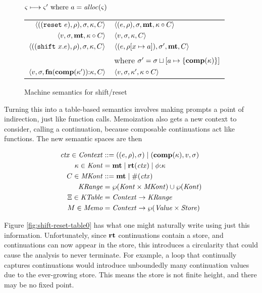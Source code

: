 \begin{figure}
  \centering
  $\varsigma \longmapsto \varsigma' \text{ where } a = \mathit{alloc}(\varsigma)$ \\
  \begin{tabular}{r|l}
    \hline
    $\langle ((\texttt{reset}\ e), \rho), \sigma, \kappa, C \rangle$
    &
    $\langle (e, \rho), \sigma, \mathbf{mt}, \kappa\circ C \rangle$
    \\
    $\langle v, \sigma, \mathbf{mt}, \kappa\circ C \rangle$
    &
    $\langle v, \sigma, {\kappa}, {C} \rangle$
    \\
    $\langle ((\texttt{shift}\ x. e), \rho), \sigma, \kappa, C \rangle$
    &
    $\langle (e, \rho[x \mapsto a]), \sigma',\mathbf{mt},C \rangle$
    \\ & where $\sigma' = \sigma\sqcup[a \mapsto \{ \mathbf{comp}(\kappa) \}]$
    \\
    $\langle v,\sigma,\mathbf{fn}{}(\mathbf{comp}(\kappa')){\tt :} \kappa, C \rangle$
    &
    $\langle v, \sigma, \kappa', \kappa\circ C \rangle$
  \end{tabular}  
  \caption{Machine semantics for shift/reset}
  \label{fig:shift-reset}
\end{figure}

Turning this into a table-based semantics involves making prompts a point of indirection, just like function calls.
%
Memoization also gets a new context to consider, calling a continuation, because composable continuations act like functions.
%
The new semantic spaces are then

\begin{align*}
  \mathit{ctx} \in \mathit{Context} &::= ((e,\rho),\sigma) \mathrel{\mid} (\mathbf{comp}(\kappa),v,\sigma) \\
  \kappa \in \mathit{Kont} &= \mathbf{mt} \mathrel{\mid} \mathbf{rt}(\mathit{ctx}) \mathrel{\mid} \phi{\tt :} \kappa \\
  C \in \mathit{MKont} &::= \mathbf{mt} \mathrel{\mid} \#(\mathit{ctx}) \\
  \mathit{KRange} &= \wp(\mathit{Kont} \times \mathit{MKont}) \cup \wp(\mathit{Kont}) \\
  \Xi \in \mathit{KTable} &= \mathit{Context} \to \mathit{KRange} \\
  M \in \mathit{Memo} &= \mathit{Context} \to \wp(\mathit{Value} \times \mathit{Store})
\end{align*}

Figure \ref{fig:shift-reset-table0} has what one might naturally write using just this information.
%
Unfortunately, since $\mathbf{rt}$ continuations contain a store, and continuations can now appear in the store, this introduces a circularity that could cause the analysis to never terminate.
%
For example, a loop that continually captures continuations would introduce unboundedly many continuation values due to the ever-growing store.
%
This means the store is not finite height, and there may be no fixed point.

